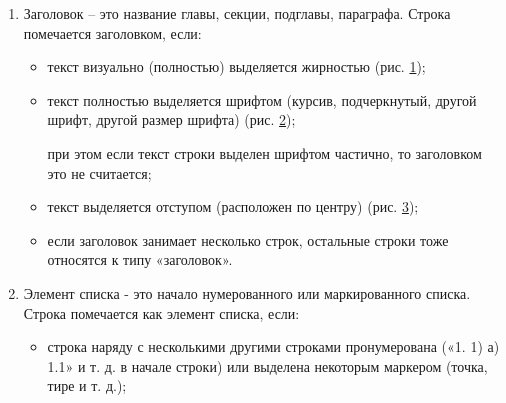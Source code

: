 \documentclass{ProcISPRAS}
\begin{document}
\begin{enumerate}
	\item Заголовок -- это название главы, секции, подглавы, параграфа. Строка помечается заголовком, если:
	\begin{itemize}
		\item текст визуально (полностью) выделяется жирностью (рис. \ref{fig:1});
		
		\begin{figure}[t]
		    \label{fig:1}
		\end{figure}
		
		\item текст полностью выделяется шрифтом (курсив, подчеркнутый, другой шрифт, другой размер шрифта) (рис. \ref{fig:2});
		
		\begin{figure}[t]
		    \label{fig:2}
		\end{figure}
		
		при этом если текст строки выделен шрифтом частично, то заголовком это не считается;
		
		\item текст выделяется отступом (расположен по центру) (рис. \ref{fig:3});
		
		\begin{figure}[t]
		    \label{fig:3}
		\end{figure}
		
		\item если заголовок занимает несколько строк, остальные строки тоже относятся к типу «заголовок».
	\end{itemize}
	
	\item Элемент списка - это начало нумерованного или маркированного списка. Строка помечается как элемент списка, если:
	\begin{itemize}
		\item строка наряду с несколькими другими строками пронумерована («1. 1) а) 1.1» и т. д. в начале строки) или выделена некоторым маркером (точка, тире и т. д.);
		

\end{itemize}
\end{enumerate}
\end{document}
